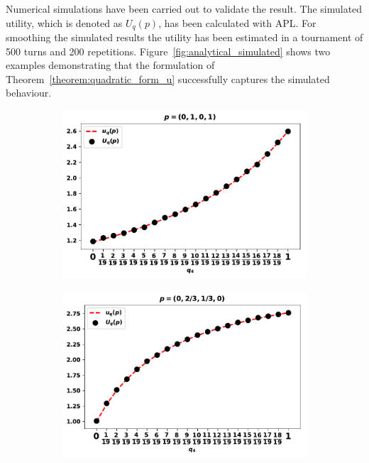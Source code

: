 

Numerical simulations have been carried out to validate the result. The simulated utility, which is
denoted as \(U_q(p)\), has been calculated with APL.
For smoothing the simulated results the utility
has been estimated in a tournament of 500 turns and 200 repetitions.
Figure~\ref{fig:analytical_simulated} shows two examples demonstrating that the
formulation of Theorem~\ref{theorem:quadratic_form_u} successfully captures the
simulated behaviour.

\begin{figure}[!htbp]
    \begin{center}
        \begin{subfigure}{0.45\textwidth}
            \includegraphics[width=\linewidth]{src/chapters/05/paper/memory-size-in-the-prisoners-dilemma/img/validation_against_player_one.pdf}
        \end{subfigure}
        \begin{subfigure}{0.45\textwidth}
            \includegraphics[width=\linewidth]{src/chapters/05/paper/memory-size-in-the-prisoners-dilemma/img/validation_against_player_two.pdf}

\end{subfigure}
\end{center}
\end{figure}
